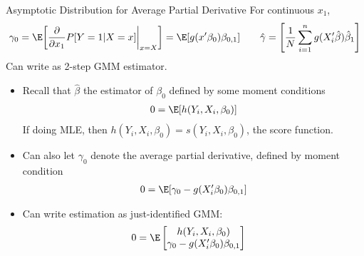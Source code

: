 \documentclass[aspectratio=169, handout]{beamer}
\newcommand{\sumin}{\sum^n_{i=1}}
\begin{document}
{\scriptsize
\begin{frame}{Asymptotic Distribution for Average Partial Derivative}
For continuous $x_1$,
\begin{align*}
  \gamma_0
  =
  \E\bigg[
  \frac{\partial }{\partial x_1}
  P[Y=1|X=x]
  \bigg|_{x=X}
  \bigg]
  =
  \E[g(x'\beta_0)\beta_{0,1}]
  \qquad
  \hat{\gamma}
  =
  \left[
    \frac{1}{N}
    \sumin
    g(X_i'\hat{\beta})\hat{\beta}_1
  \right]
\end{align*}
Can write as \alert{2-step GMM estimator}.
\begin{itemize}
  \item Recall that $\hat{\beta}$ the estimator of $\beta_0$ defined by
    some moment conditions
    \begin{align*}
      0 = \E[h(Y_i,X_i,\beta_0)]
    \end{align*}
    If doing MLE, then $h(Y_i,X_i,\beta_0)=s(Y_i,X_i,\beta_0)$, the
    score function.

  \item
    Can also let $\gamma_0$ denote the average partial derivative,
    defined by moment condition
    \begin{align*}
      0 = \E[\gamma_0-g(X_i'\beta_0)\beta_{0,1}]
    \end{align*}

  \item
    Can write estimation as just-identified GMM:
    \begin{align*}
      0
      &=
      \E
        \begin{bmatrix}
          h(Y_i,X_i,\beta_0)
          \\
          \gamma_0-g(X_i'\beta_0)\beta_{0,1}
        \end{bmatrix}
    \end{align*}
\end{itemize}
\end{frame}
}
\end{document}
